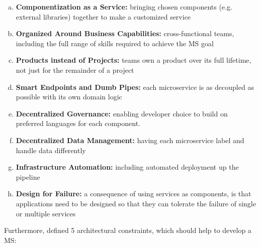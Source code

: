 \begin{enumerate}[(a)]
	\item \textbf{Componentization as a Service:} bringing chosen components (e.g. external libraries) together to make a customized service
	\item \textbf{Organized Around Business Capabilities:} cross-functional teams, including the full range of skills required to achieve the MS goal
	\item \textbf{Products instead of Projects:} teams own a product over its full lifetime, not just for the remainder of a project
	\item \textbf{Smart Endpoints and Dumb Pipes:} each microservice is as decoupled as possible with its own domain logic
	\item \textbf{Decentralized Governance:} enabling developer choice to build on preferred languages for each component.
	\item \textbf{Decentralized Data Management:} having each microservice label and handle data differently
	\item \textbf{Infrastructure Automation:} including automated deployment up the pipeline
	\item \textbf{Design for Failure:} a consequence of using services as components, is that applications need to be designed so that they can tolerate the failure of single or multiple services
\end{enumerate}

Furthermore, \cite{Bugwadia15} defined 5 architectural constraints, which should help to develop a MS:

